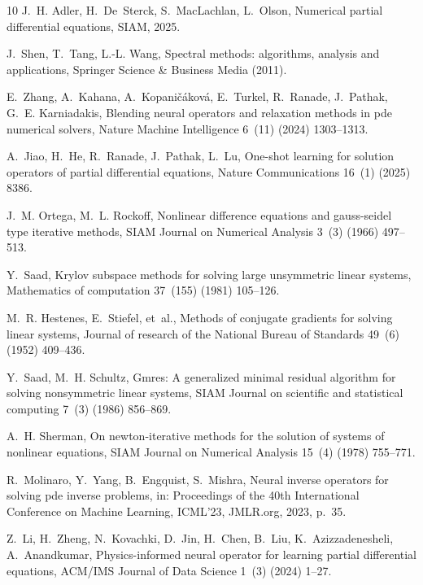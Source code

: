 \documentclass[preprint,numbers,sort&compress]{elsarticle}
\begin{document}
\begin{thebibliography}{10}
				J.~H. Adler, H.~De~Sterck, S.~MacLachlan, L.~Olson, Numerical partial
				differential equations, SIAM, 2025.
				
				J.~Shen, T.~Tang, L.-L. Wang, Spectral methods: algorithms, analysis and
				applications, Springer Science \& Business Media (2011).
				
				E.~Zhang, A.~Kahana, A.~Kopani{\v{c}}{\'a}kov{\'a}, E.~Turkel, R.~Ranade,
				J.~Pathak, G.~E. Karniadakis, Blending neural operators and relaxation
				methods in pde numerical solvers, Nature Machine Intelligence 6~(11) (2024)
				1303--1313.
				
				A.~Jiao, H.~He, R.~Ranade, J.~Pathak, L.~Lu, One-shot learning for solution
				operators of partial differential equations, Nature Communications 16~(1)
				(2025) 8386.
				
				J.~M. Ortega, M.~L. Rockoff, Nonlinear difference equations and gauss-seidel
				type iterative methods, SIAM Journal on Numerical Analysis 3~(3) (1966)
				497--513.
				
				Y.~Saad, Krylov subspace methods for solving large unsymmetric linear systems,
				Mathematics of computation 37~(155) (1981) 105--126.
				
				M.~R. Hestenes, E.~Stiefel, et~al., Methods of conjugate gradients for solving
				linear systems, Journal of research of the National Bureau of Standards
				49~(6) (1952) 409--436.
				
				Y.~Saad, M.~H. Schultz, Gmres: A generalized minimal residual algorithm for
				solving nonsymmetric linear systems, SIAM Journal on scientific and
				statistical computing 7~(3) (1986) 856--869.
				
				A.~H. Sherman, On newton-iterative methods for the solution of systems of
				nonlinear equations, SIAM Journal on Numerical Analysis 15~(4) (1978)
				755--771.
				
				R.~Molinaro, Y.~Yang, B.~Engquist, S.~Mishra, Neural inverse operators for
				solving pde inverse problems, in: Proceedings of the 40th International
				Conference on Machine Learning, ICML'23, JMLR.org, 2023, p.~35.
				
				Z.~Li, H.~Zheng, N.~Kovachki, D.~Jin, H.~Chen, B.~Liu, K.~Azizzadenesheli,
				A.~Anandkumar, Physics-informed neural operator for learning partial
				differential equations, ACM/IMS Journal of Data Science 1~(3) (2024) 1--27.
				

\end{thebibliography}
\end{document}
